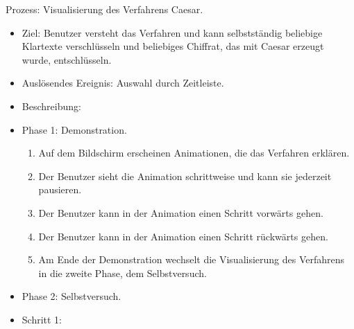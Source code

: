 \documentclass{article}
\begin{document}
\begin{FA}[start=110]
 \item Prozess: Visualisierung des Verfahrens Caesar.
\end{FA}
\begin{itemize}[label={}]

 \item Ziel: Benutzer versteht das Verfahren und kann selbstständig 
beliebige Klartexte verschlüsseln und beliebiges Chiffrat, das mit 
Caesar erzeugt wurde, entschlüsseln.

 \item Auslösendes Ereignis: Auswahl durch Zeitleiste.

 \item Beschreibung:

 \item Phase 1: Demonstration.

	\begin{enumerate}
	 \item Auf dem Bildschirm erscheinen Animationen, die das Verfahren erklären.
	 \item Der Benutzer sieht die Animation schrittweise und kann sie jederzeit pausieren.
	 \item Der Benutzer kann in der Animation einen Schritt vorwärts gehen.
	 \item Der Benutzer kann in der Animation einen Schritt rückwärts gehen. 
	 \item Am Ende der Demonstration wechselt die Visualisierung des Verfahrens in die zweite Phase, dem Selbstversuch.
	\end{enumerate}

 \item Phase 2: Selbstversuch.

 \item Schritt 1:


\end{itemize}
\end{document}
